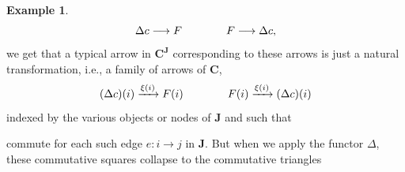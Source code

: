 \documentclass[a4paper]{book}
\theoremstyle{definition}
\newtheorem{example}{Example}[section]
\theoremstyle{definition}
\theoremstyle{definition}
\theoremstyle{theorem}
\theoremstyle{definition}
\begin{document}
\begin{example}
	\begin{equation*}
	\Delta c \longrightarrow F \hspace*{4em} F \longrightarrow \Delta c,  
	\end{equation*}
	we get that a typical arrow in $\textbf{C}^{\textbf{J}}$ corresponding to these arrows is just a natural transformation, i.e., a family of arrows of $\textbf{C}$, 
	\begin{equation*}
	(\Delta c)(i) \xrightarrow{\xi(i)} F(i) \hspace*{4em} F(i) \xrightarrow{\xi (i)} (\Delta c)(i)  
	\end{equation*}
	indexed by the various objects or nodes of $\textbf{J}$ and such that 
	\begin{center} 
	\end{center} \par \noindent 
	commute for each such edge $e: i \rightarrow j$ in \textbf{J}. But when we apply the functor $\Delta$, these commutative squares collapse to the commutative triangles
	\begin{center} 
	\end{center} \par \noindent 

\end{example}
\end{document}
